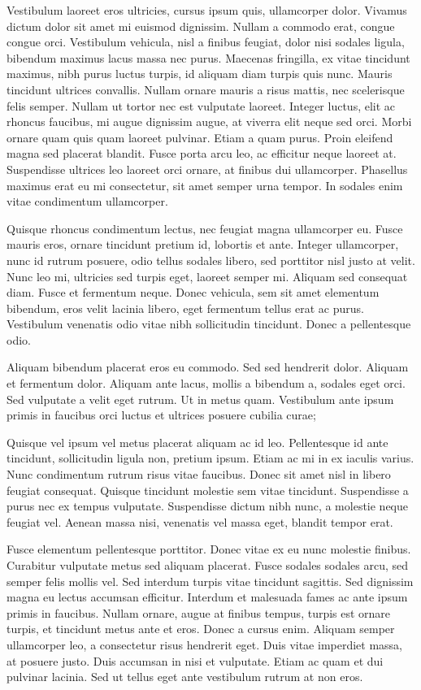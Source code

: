 Vestibulum laoreet eros ultricies, cursus ipsum quis, ullamcorper dolor. Vivamus dictum dolor sit amet mi euismod dignissim. Nullam a commodo erat, congue congue orci. Vestibulum vehicula, nisl a finibus feugiat, dolor nisi sodales ligula, bibendum maximus lacus massa nec purus. Maecenas fringilla, ex vitae tincidunt maximus, nibh purus luctus turpis, id aliquam diam turpis quis nunc. Mauris tincidunt ultrices convallis. Nullam ornare mauris a risus mattis, nec scelerisque felis semper. Nullam ut tortor nec est vulputate laoreet. Integer luctus, elit ac rhoncus faucibus, mi augue dignissim augue, at viverra elit neque sed orci. Morbi ornare quam quis quam laoreet pulvinar. Etiam a quam purus. Proin eleifend magna sed placerat blandit. Fusce porta arcu leo, ac efficitur neque laoreet at. Suspendisse ultrices leo laoreet orci ornare, at finibus dui ullamcorper. Phasellus maximus erat eu mi consectetur, sit amet semper urna tempor. In sodales enim vitae condimentum ullamcorper.

Quisque rhoncus condimentum lectus, nec feugiat magna ullamcorper eu. Fusce mauris eros, ornare tincidunt pretium id, lobortis et ante. Integer ullamcorper, nunc id rutrum posuere, odio tellus sodales libero, sed porttitor nisl justo at velit. Nunc leo mi, ultricies sed turpis eget, laoreet semper mi. Aliquam sed consequat diam. Fusce et fermentum neque. Donec vehicula, sem sit amet elementum bibendum, eros velit lacinia libero, eget fermentum tellus erat ac purus. Vestibulum venenatis odio vitae nibh sollicitudin tincidunt. Donec a pellentesque odio.

Aliquam bibendum placerat eros eu commodo. Sed sed hendrerit dolor. Aliquam et fermentum dolor. Aliquam ante lacus, mollis a bibendum a, sodales eget orci. Sed vulputate a velit eget rutrum. Ut in metus quam. Vestibulum ante ipsum primis in faucibus orci luctus et ultrices posuere cubilia curae;

Quisque vel ipsum vel metus placerat aliquam ac id leo. Pellentesque id ante tincidunt, sollicitudin ligula non, pretium ipsum. Etiam ac mi in ex iaculis varius. Nunc condimentum rutrum risus vitae faucibus. Donec sit amet nisl in libero feugiat consequat. Quisque tincidunt molestie sem vitae tincidunt. Suspendisse a purus nec ex tempus vulputate. Suspendisse dictum nibh nunc, a molestie neque feugiat vel. Aenean massa nisi, venenatis vel massa eget, blandit tempor erat.

Fusce elementum pellentesque porttitor. Donec vitae ex eu nunc molestie finibus. Curabitur vulputate metus sed aliquam placerat. Fusce sodales sodales arcu, sed semper felis mollis vel. Sed interdum turpis vitae tincidunt sagittis. Sed dignissim magna eu lectus accumsan efficitur. Interdum et malesuada fames ac ante ipsum primis in faucibus. Nullam ornare, augue at finibus tempus, turpis est ornare turpis, et tincidunt metus ante et eros. Donec a cursus enim. Aliquam semper ullamcorper leo, a consectetur risus hendrerit eget. Duis vitae imperdiet massa, at posuere justo. Duis accumsan in nisi et vulputate. Etiam ac quam et dui pulvinar lacinia. Sed ut tellus eget ante vestibulum rutrum at non eros.

